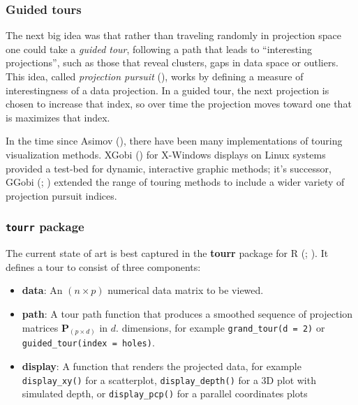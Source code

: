 \documentclass[
  letterpaper,
  10pt,
  krantz2]{krantz}
\providecommand{\tightlist}{%
  \setlength{\itemsep}{0pt}\setlength{\parskip}{0pt}}\usepackage{longtable,booktabs,array}
\begin{document}
\subsubsection{Guided tours}\label{guided-tours}

The next big idea was that rather than traveling randomly in projection
space one could take a \emph{guided tour}, following a path that leads
to ``interesting projections'', such as those that reveal clusters, gaps
in data space or outliers. This idea, called \emph{projection pursuit}
(), works by defining
a measure of interestingness of a data projection. In a guided tour, the
next projection is chosen to increase that index, so over time the
projection moves toward one that is maximizes that index.

In the time since Asimov (), there have
been many implementations of touring visualization methods. XGobi
() for X-Windows
displays on Linux systems provided a test-bed for dynamic, interactive
graphic methods; it's successor, GGobi
(;
) extended the range
of touring methods to include a wider variety of projection pursuit
indices.

\subsubsection{\texorpdfstring{\texttt{tourr}
package}{tourr package}}\label{tourr-package}

The current state of art is best captured in the \textbf{tourr} package
for R (;
). It defines a tour to
consist of three components:

\begin{itemize}
\tightlist
\item
  \textbf{data}: An \((n \times p)\) numerical data matrix to be viewed.
\item
  \textbf{path}: A tour path function that produces a smoothed sequence
  of projection matrices \(\mathbf{P}_{(p \times d)}\) in \(d\).
  dimensions, for example \texttt{grand\_tour(d\ =\ 2)} or
  \texttt{guided\_tour(index\ =\ holes)}.
\item
  \textbf{display}: A function that renders the projected data, for
  example \texttt{display\_xy()} for a scatterplot,
  \texttt{display\_depth()} for a 3D plot with simulated depth, or
  \texttt{display\_pcp()} for a parallel coordinates plots
\end{itemize}
\end{document}
